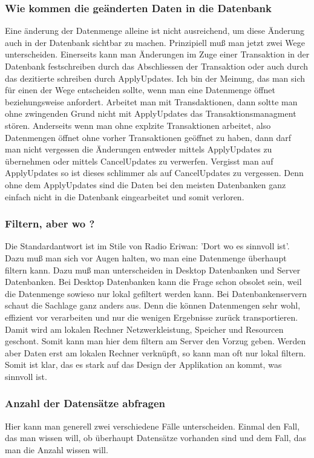 \subsubsection{Wie kommen die geänderten Daten in die Datenbank}
Eine änderung der Datenmenge alleine ist nicht ausreichend, um diese Änderung auch in der Datenbank sichtbar zu machen. Prinzipiell muß man jetzt zwei Wege unterscheiden. Einerseits kann man Änderungen im Zuge einer Transaktion in der Datenbank festschreiben durch das Abschliessen der Transaktion oder auch durch das dezitierte schreiben durch ApplyUpdates. Ich bin der Meinung, das man sich für einen der Wege entscheiden sollte, wenn man eine Datenmenge öffnet beziehungsweise anfordert. 
Arbeitet man mit Transdaktionen, dann soltte man ohne zwingenden Grund nicht mit ApplyUpdates das Transaktions\-managment stören.
Anderseits wenn man ohne explzite Transaktionen arbeitet, also Datenmengen öffnet ohne vorher Transaktionen geöffnet zu haben, dann darf man nicht vergessen die Änderungen entweder mittels ApplyUpdates zu übernehmen oder mittels CancelUpdates zu verwerfen. Vergisst man auf ApplyUpdates so ist dieses schlimmer als auf CancelUpdates zu vergessen. Denn ohne dem ApplyUpdates sind die Daten bei den meisten Datenbanken ganz einfach nicht in die Datenbank eingearbeitet und somit verloren.

\subsubsection{Filtern, aber wo ?}
Die Standardantwort ist im Stile von Radio Eriwan: 'Dort wo es sinnvoll ist'. Dazu muß man sich vor Augen halten, wo man eine Datenmenge überhaupt filtern kann. Dazu muß man unterscheiden in Desktop Datenbanken und Server Datenbanken. 
Bei Desktop Datenbanken kann die Frage schon obsolet sein, weil die Datenmenge sowieso nur lokal gefiltert werden kann. 
Bei Datenbankenservern schaut die Sachlage ganz anders aus. Denn die können Datenmengen sehr wohl, effizient vor verarbeiten und nur die wenigen Ergebnisse zurück transportieren. Damit wird am lokalen Rechner Netzwerkleistung, Speicher und Resourcen geschont. Somit kann man hier dem filtern am Server den Vorzug geben. Werden aber Daten erst am lokalen Rechner verknüpft, so kann man oft nur lokal filtern. 
Somit ist klar, das es stark auf das Design der Applikation an kommt, was sinnvoll ist.  

\subsubsection{Anzahl der Datensätze abfragen}
Hier kann man generell zwei verschiedene Fälle unterscheiden. Einmal den Fall, das man wissen will, ob überhaupt Datensätze vorhanden sind und dem Fall, das man die Anzahl wissen will. 

